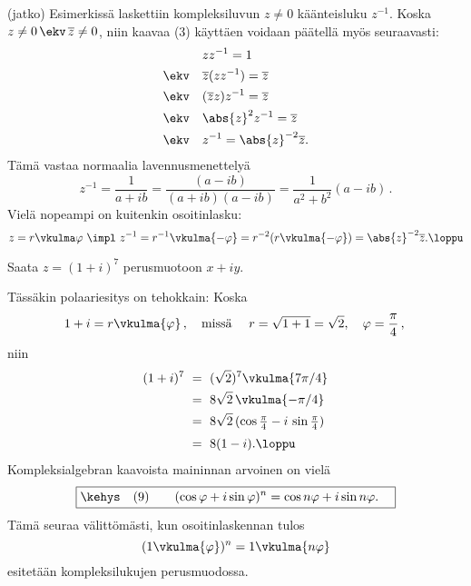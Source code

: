 \jatko \begin{Exa} (jatko) Esimerkissä laskettiin kompleksiluvun $z \neq 0$ käänteisluku 
$z^{-1}$. Koska $z \neq 0\,\ekv\,\overline{z} \neq 0$, niin kaavaa (3) käyttäen voidaan
päätellä myös seuraavasti:
\begin{align*}
           & zz^{-1} = 1 \\
\ekv \quad &\overline{z}(zz^{-1}) = \overline{z} \\
\ekv \quad &(\overline{z}z)z^{-1} = \overline{z} \\
\ekv \quad &\abs{z}^2z^{-1} = \overline{z} \\
\ekv \quad &z^{-1} = \abs{z}^{-2} \overline{z}.
\end{align*}
Tämä vastaa normaalia lavennusmenettelyä
\[
z^{-1} = \frac{1}{a+ib} = \frac{(a - ib)}{(a+ib)(a-ib)} 
= \frac{1}{a^2+b^2}(a-ib)\,.
\]
Vielä nopeampi on kuitenkin osoitinlasku:
\[
z = r \vkulma \varphi\ \impl\ z^{-1} = r^{-1} \vkulma{-\varphi} 
  = r^{-2}(r \vkulma{-\varphi}) = \abs{z}^{-2} \overline{z}. \loppu
\]
\end{Exa}
\begin{Exa} Saata $z=(1+i)^7$ perusmuotoon $x+iy$. \end{Exa}
\ratk Tässäkin polaariesitys on tehokkain: Koska
\[
1+i = r \vkulma{\varphi}\,,\quad \text{missä}\ \quad r
    = \sqrt{1+1} = \sqrt{2}, \quad \varphi = \frac{\pi}{4}\,, \\
\]
niin
\begin{align*}
(1+i)^7 \ &=\ (\sqrt{2})^7 \vkulma{7\pi/4} \\
          &=\ 8 \sqrt{2}\,\vkulma{-\pi/4} \\
          &=\ 8 \sqrt{2}\,(\cos\tfrac{\pi}{4} - i\,\sin\tfrac{\pi}{4}) \\[1mm]                
          &=\ 8(1-i). \loppu
\end{align*}
Kompleksialgebran kaavoista maininnan arvoinen on vielä
%
\[
\boxed{\kehys\quad \text{(9)} \qquad (\cos \varphi + i \sin \varphi)^n 
                                        = \cos n \varphi + i \sin n \varphi. \quad}
\]
Tämä seuraa välittömästi, kun osoitinlaskennan tulos
\[
(1 \vkulma{\varphi})^n = 1 \vkulma{n \varphi}
\]
esitetään kompleksilukujen perusmuodossa.
